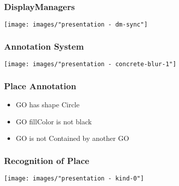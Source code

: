 \begin{frame}
  \frametitle{DisplayManagers}
  \centering
  \hspace{-1cm}
  \texttt{[image: images/"presentation - dm-sync"]}
\end{frame}

\begin{frame}
  \frametitle{Annotation System}
  \hspace{-1cm}
  \texttt{[image: images/"presentation - concrete-blur-1"]}
\end{frame}








\begin{frame}[fragile]
  \frametitle{Place Annotation}
  \vspace{-1cm}

  \begin{itemize}
    \setlength\itemsep{1cm}
    \item GO has shape Circle
    \item GO fillColor is not black
    \item GO is not Contained by another GO
  \end{itemize}
\end{frame}

\begin{frame}
  \frametitle{Recognition of Place}
  \hspace{-1cm}
  \texttt{[image: images/"presentation - kind-0"]}
\end{frame}

